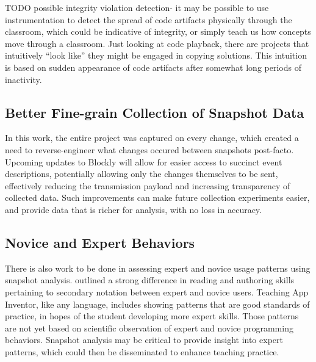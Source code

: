 TODO possible integrity violation detection- it may be possible to use instrumentation to detect the spread of code artifacts physically through the classroom, which could be indicative of integrity, or simply teach us how concepts move through a classroom. Just looking at code playback, there are projects that intuitively ``look like'' they might be engaged in copying solutions. This intuition is based on sudden appearance of code artifacts after somewhat long periods of inactivity. 


\subsection{Better Fine-grain Collection of Snapshot Data} 
In this work, the entire project was captured on every change, which created a need to reverse-engineer what changes occured between snapshots post-facto. Upcoming updates to Blockly will allow for easier access to succinct event descriptions, potentially allowing only the changes themselves to be sent, effectively reducing the transmission payload and increasing transparency of collected data. Such improvements can make future collection experiments easier, and provide data that is richer for analysis, with no loss in accuracy. 

\subsection{Novice and Expert Behaviors}
There is also work to be done in assessing expert and novice usage patterns using snapshot analysis. \cite{petre-1995} outlined a strong difference in reading and authoring skills pertaining to secondary notation between expert and novice users. Teaching App Inventor, like any language, includes showing patterns that are good standards of practice, in hopes of the student developing more expert skills. Those patterns are not yet based on scientific observation of expert and novice programming behaviors. Snapshot analysis may be critical to provide insight into expert patterns, which could then be disseminated to enhance teaching practice. 

